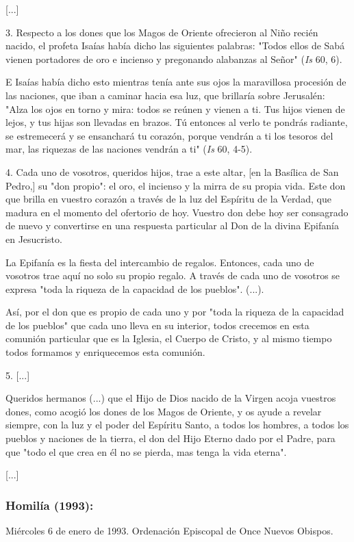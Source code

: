 {[}...{]}

3. Respecto a los dones que los Magos de Oriente ofrecieron al Niño
recién nacido, el profeta Isaías había dicho las siguientes palabras:
"Todos ellos de Sabá vienen portadores de oro e incienso y pregonando
alabanzas al Señor" (\emph{Is} 60, 6).

E Isaías había dicho esto mientras tenía ante sus ojos la maravillosa
procesión de las naciones, que iban a caminar hacia esa luz, que
brillaría sobre Jerusalén: "Alza los ojos en torno y mira: todos se
reúnen y vienen a ti. Tus hijos vienen de lejos, y tus hijas son
llevadas en brazos. Tú entonces al verlo te pondrás radiante, se
estremecerá y se ensanchará tu corazón, porque vendrán a ti los tesoros
del mar, las riquezas de las naciones vendrán a ti" (\emph{Is} 60, 4-5).

4. Cada uno de vosotros, queridos hijos, trae a este altar, {[}en la
Basílica de San Pedro,{]} su "don propio": el oro, el incienso y la
mirra de su propia vida. Este don que brilla en vuestro corazón a través
de la luz del Espíritu de la Verdad, que madura en el momento del
ofertorio de hoy. Vuestro don debe hoy ser consagrado de nuevo y
convertirse en una respuesta particular al Don de la divina Epifanía en
Jesucristo.

La Epifanía es la fiesta del intercambio de regalos. Entonces, cada uno
de vosotros trae aquí no solo su propio regalo. A través de cada uno de
vosotros se expresa "toda la riqueza de la capacidad de los pueblos".
(...).

Así, por el don que es propio de cada uno y por "toda la riqueza de la
capacidad de los pueblos" que cada uno lleva en su interior, todos
crecemos en esta comunión particular que es la Iglesia, el Cuerpo de
Cristo, y al mismo tiempo todos formamos y enriquecemos esta comunión.

5. {[}...{]}

Queridos hermanos (...) que el Hijo de Dios nacido de la Virgen acoja
vuestros dones, como acogió los dones de los Magos de Oriente, y os
ayude a revelar siempre, con la luz y el poder del Espíritu Santo, a
todos los hombres, a todos los pueblos y naciones de la tierra, el don
del Hijo Eterno dado por el Padre, para que "todo el que crea en él no
se pierda, mas tenga la vida eterna".

{[}...{]}

\subsubsection{Homilía (1993): }
Miércoles 6 de enero de 1993. 
Ordenación Episcopal de Once Nuevos
Obispos.


